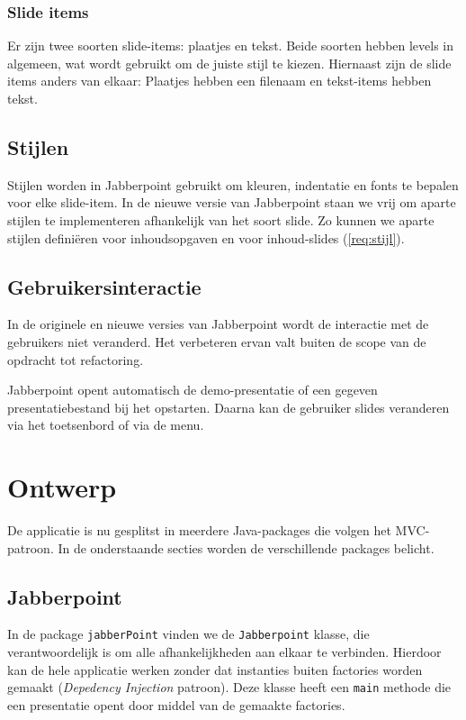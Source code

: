 \documentclass[a4paper]{article}
\newcommand{\reqref}[1]{\ref{req:#1}}
\newcommand{\code}[1]{\lstinline[columns=fixed]{#1}}
\begin{document}
		\subsubsection{Slide items}
			Er zijn twee soorten slide-items: plaatjes en tekst.
			Beide soorten hebben levels in algemeen, wat wordt gebruikt om de juiste stijl te kiezen.
			Hiernaast zijn de slide items anders van elkaar: Plaatjes hebben een filenaam en tekst-items hebben tekst.

		\subsection{Stijlen}
			Stijlen worden in Jabberpoint gebruikt om kleuren, indentatie en fonts te bepalen voor elke slide-item.
			In de nieuwe versie van Jabberpoint staan we vrij om aparte stijlen te implementeren afhankelijk van het soort slide.
			Zo kunnen we aparte stijlen definiëren voor inhoudsopgaven en voor inhoud-slides (\reqref{stijl}).

	\subsection{Gebruikersinteractie}\label{sec:control-analyse}
		In de originele en nieuwe versies van Jabberpoint wordt de interactie met de gebruikers niet veranderd.
		Het verbeteren ervan valt buiten de scope van de opdracht tot refactoring.

		Jabberpoint opent automatisch de demo-presentatie of een gegeven presentatiebestand bij het opstarten.
		Daarna kan de gebruiker slides veranderen via het toetsenbord of via de menu.

\section{Ontwerp}\label{sec:ontwerp}
	De applicatie is nu gesplitst in meerdere Java-packages die volgen het MVC-patroon.
	In de onderstaande secties worden de verschillende packages belicht.

	\subsection{Jabberpoint}
		In de package \code{jabberPoint} vinden we de \code{Jabberpoint} klasse, die verantwoordelijk is om alle afhankelijkheden aan elkaar te verbinden.
		Hierdoor kan de hele applicatie werken zonder dat instanties buiten factories worden gemaakt (\textit{Depedency Injection} patroon).
		Deze klasse heeft een \code{main} methode die een presentatie opent door middel van de gemaakte factories.
\end{document}
